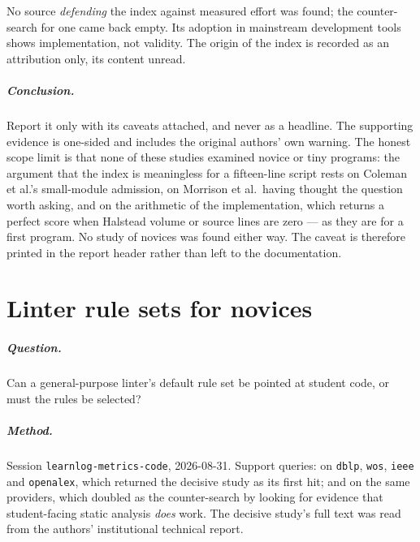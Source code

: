 No source \emph{defending} the index against measured effort was found; the
counter-search for one came back empty.  Its adoption in mainstream
development tools shows implementation, not validity.  The origin of the
index \autocite{OmanHagemeister1992} is recorded as an attribution only, its
content unread.

\paragraph{Conclusion.}
Report it only with its caveats attached, and never as a headline.  The
supporting evidence is one-sided and includes the original authors' own
warning.  The honest scope limit is that none of these studies examined
novice or tiny programs: the argument that the index is meaningless for a
fifteen-line script rests on Coleman et al.'s small-module admission, on
Morrison et al.\ having thought the question worth asking, and on the
arithmetic of the implementation, which returns a perfect score when
Halstead volume or source lines are zero --- as they are for a first
program.  No study of novices was found either way.  The caveat is therefore
printed in the report header rather than left to the documentation.

\chapter{Linter rule sets for novices}
\label{app:claim:linter-rules}

\paragraph{Question.}
Can a general-purpose linter's default rule set be pointed at student code,
or must the rules be selected?

\paragraph{Method.}
Session \texttt{learnlog-metrics-code}, 2026-08-31.  Support queries:
 on \texttt{dblp}, \texttt{wos},
\texttt{ieee} and \texttt{openalex}, which returned the decisive study as
its first hit; and  on the same providers, which doubled as the counter-search by
looking for evidence that student-facing static analysis \emph{does} work.
The decisive study's full text was read from the authors' institutional
technical report.

